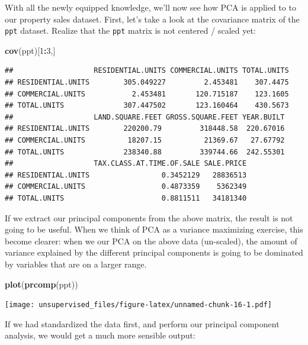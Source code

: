 \documentclass[]{article}
\newenvironment{Shaded}{\begin{snugshade}}{\end{snugshade}}
\newcommand{\DecValTok}[1]{\textcolor[rgb]{0.00,0.00,0.81}{#1}}
\newcommand{\KeywordTok}[1]{\textcolor[rgb]{0.13,0.29,0.53}{\textbf{#1}}}
\newcommand{\NormalTok}[1]{#1}
\newcommand{\OperatorTok}[1]{\textcolor[rgb]{0.81,0.36,0.00}{\textbf{#1}}}
\begin{document}
With all the newly equipped knowledge, we'll now see how PCA is applied
to to our property sales dataset. First, let's take a look at the
covariance matrix of the \texttt{ppt} dataset. Realize that the
\texttt{ppt} matrix is not centered / scaled yet:

\begin{Shaded}
\begin{Highlighting}[]
\KeywordTok{cov}\NormalTok{(ppt)[}\DecValTok{1}\OperatorTok{:}\DecValTok{3}\NormalTok{,]}
\end{Highlighting}
\end{Shaded}

\begin{verbatim}
##                   RESIDENTIAL.UNITS COMMERCIAL.UNITS TOTAL.UNITS
## RESIDENTIAL.UNITS        305.049227         2.453481    307.4475
## COMMERCIAL.UNITS           2.453481       120.715187    123.1605
## TOTAL.UNITS              307.447502       123.160464    430.5673
##                   LAND.SQUARE.FEET GROSS.SQUARE.FEET YEAR.BUILT
## RESIDENTIAL.UNITS        220200.79         318448.58  220.67016
## COMMERCIAL.UNITS          18207.15          21369.67   27.67792
## TOTAL.UNITS              238340.88         339744.66  242.55301
##                   TAX.CLASS.AT.TIME.OF.SALE SALE.PRICE
## RESIDENTIAL.UNITS                 0.3452129   28836513
## COMMERCIAL.UNITS                  0.4873359    5362349
## TOTAL.UNITS                       0.8811511   34181340
\end{verbatim}

If we extract our principal components from the above matrix, the result
is not going to be useful. When we think of PCA as a variance maximizing
exercise, this become clearer: when we our PCA on the above data
(un-scaled), the amount of variance explained by the different principal
components is going to be dominated by variables that are on a larger
range.

\begin{Shaded}
\begin{Highlighting}[]
\KeywordTok{plot}\NormalTok{(}\KeywordTok{prcomp}\NormalTok{(ppt))}
\end{Highlighting}
\end{Shaded}

\texttt{[image: unsupervised\_files/figure-latex/unnamed-chunk-16-1.pdf]}

If we had standardized the data first, and perform our principal
component analysis, we would get a much more sensible output:
\end{document}
